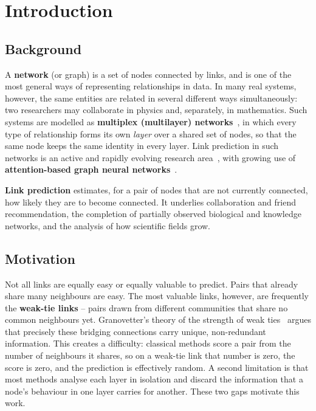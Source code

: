 \chapter{Introduction}
\label{ch:introduction}

\section{Background}
A \textbf{network} (or graph) is a set of nodes connected by links, and is one of the most general
ways of representing relationships in data. In many real systems, however, the same entities are
related in several different ways simultaneously: two researchers may collaborate in physics and,
separately, in mathematics. Such systems are modelled as \textbf{multiplex (multilayer)
networks}~\cite{kivela2014}, in which every type of relationship forms its own \emph{layer} over a
shared set of nodes, so that the same node keeps the same identity in every layer. Link prediction
in such networks is an active and rapidly evolving research area~\cite{zangari2024,heuristickdd2024}, with
growing use of \textbf{attention-based graph neural networks}~\cite{gatv2,attnsurvey2023}.

\textbf{Link prediction} estimates, for a pair of nodes that are not currently connected, how likely
they are to become connected. It underlies collaboration and friend recommendation, the completion
of partially observed biological and knowledge networks, and the analysis of how scientific fields
grow.

\section{Motivation}
Not all links are equally easy or equally valuable to predict. Pairs that already share many
neighbours are easy. The most valuable links, however, are frequently the \textbf{weak-tie links} --
pairs drawn from different communities that share no common neighbours yet. Granovetter's theory of
the strength of weak ties~\cite{granovetter1973} argues that precisely these bridging connections
carry unique, non-redundant information. This creates a difficulty: classical methods score a pair
from the number of neighbours it shares, so on a weak-tie link that number is zero, the score is
zero, and the prediction is effectively random. A second limitation is that most methods analyse
each layer in isolation and discard the information that a node's behaviour in one layer carries for
another. These two gaps motivate this work.

